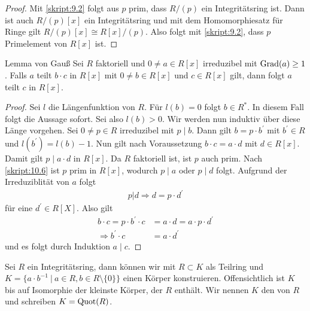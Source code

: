 \begin{proof}
	Mit \ref{skript:9.2} folgt aus $ p  $ prim, dass $ R/(p) $ ein Integritätsring ist.
	Dann ist auch $ R/(p)[x] $ ein Integritätsring und mit dem Homomorphiesatz für Ringe gilt
	$ R/(p)[x] \cong R[x]/(p) $.
	Also folgt mit \ref{skript:9.2}, dass $ p $ Primelement von $ R[x] $ ist.
\end{proof}

\begin{genericthm}{Lemma von Gauß}\label{skript:10.7}
	Sei $ R $ faktoriell und $ 0 \neq a \in R[x] $ irreduzibel mit $ \operatorname{Grad}(a) \geq 1 $.
	Falls $ a $ teilt $ b \cdot c $ in $ R[x] $ mit $ 0 \neq b \in R[x] $ und $ c \in R[x] $ gilt,
	dann folgt $ a $ teilt $ c $ in $ R[x] $.
\end{genericthm}

\begin{proof}
	Sei $ l $ die Längenfunktion von $ R $.
	Für $ l(b) = 0 $ folgt $ b \in R^\ast $.
	In diesem Fall folgt die Aussage sofort.
	Sei also $ l(b) > 0$.
	Wir werden nun induktiv über diese Länge vorgehen.
	Sei $ 0 \neq p \in R $ irreduzibel mit $ p \mid b $.
	Dann gilt $ b = p \cdot b^\prime $ mit $ b^\prime \in R $ 
	und $ l(b^\prime) = l(b) -1 $.
	Nun gilt nach Voraussetzung $ b \cdot c = a \cdot d $ mit $ d \in R[x] $.
	Damit gilt $ p \mid a\cdot d  $ in $ R[x] $.
	Da $ R $ faktoriell ist, ist $ p $ auch prim.
	Nach \ref{skript:10.6} ist $ p $ prim in $ R[x] $,
	wodurch $ p \mid a $ oder $ p \mid d  $ folgt.
	Aufgrund der Irreduziblität von $ a $ folgt
	\begin{align*}
	p | d 
	\Rightarrow
	d = p \cdot d^\prime
	\end{align*}
	für eine $ d^\prime \in R[X] $.
	Also gilt
	\begin{align*}
	b \cdot c = p \cdot b^\prime \cdot c &= a \cdot d = a \cdot p \cdot d^\prime \\
	\Rightarrow b^\prime \cdot c &= a \cdot d^\prime
	\end{align*}
	und es folgt durch Induktion $ a \mid c $.
\end{proof}

\begin{df}\label{skript:10.8}
	Sei $R$ ein Integritätsring,
	dann können wir mit $R \subset K$ als Teilring
	und $K = \lbrace a \cdot b^{-1} \ | \ a \in R , b \in R \setminus \lbrace 0 \rbrace \rbrace$
	einen Körper konstruieren.
	Offensichtlich ist $K$ bis auf Isomorphie der kleinste Körper, der $R$ enthält. 
	Wir nennen $K$ den  von $R$ und schreiben $K = \operatorname{Quot}(R)$.
\end{df}

